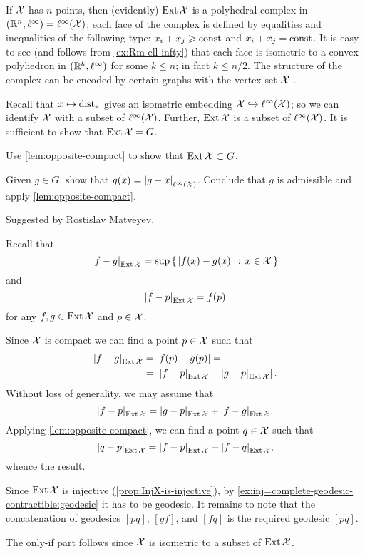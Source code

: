 If $\mathcal{X}$ has $n$-points, then (evidently) $\mathop{\rm Ext}\nolimits\mathcal{X}$ is a polyhedral complex in $(\RR^n,\ell^\infty) \z=\ell^\infty(\spc{X})$;
each face of the complex is defined by equalities and inequalities of the following type: $x_i+x_j\geqslant \operatorname{\rm const}\nolimits$ and  $x_i+x_j= \operatorname{\rm const}\nolimits$.
It is easy to see (and follows from \ref{ex:Rm-ell-infty}) that each face is isometric to a convex polyhedron in  $(\mathbb{R}^k,\ell^\infty)$ for some $k\le n$;
in fact $k\le n/2$.
The structure of the complex can be encoded by certain graphs with the vertex set $\mathcal{X}$ \cite[see Section 4 in][]{lang-2013}.

Recall that $x\mapsto \mathrm{dist}_x$ gives an isometric embedding $\spc{X}\z\hookrightarrow\ell^\infty(\spc{X})$;
so we can identify $\mathcal{X}$ with a subset of $\ell^\infty(\mathcal{X})$.
Further, $\mathop{\rm Ext}\nolimits\mathcal{X}$ is a subset of $\ell^\infty(\mathcal{X})$.
It is sufficient to show that $\mathop{\rm Ext}\nolimits\mathcal{X}=G$.

Use \ref{lem:opposite-compact} to show that $\mathop{\rm Ext}\nolimits\mathcal{X}\subset G$.

Given $g\in G$, show that $g(x)=\dist{g}{x}{\ell^\infty(\spc{X})}$.
Conclude that $g$ is admissible and apply \ref{lem:opposite-compact}.

 Suggested by Rostislav Matveyev.

Recall that 
\[\dist{f}{g}{\Inj\spc{X}}=\sup\set{|f(x)-g(x)|}{x\in\spc{X}}\]
and 
\[\dist{f}{p}{\Inj\spc{X}}=f(p)\]
for any $f,g\in \mathop{\rm Ext}\nolimits\mathcal{X}$ and $p\in \mathcal{X}$.

Since $\mathcal{X}$ is compact we can find a point $p\in\mathcal{X}$ such that 
\begin{align*}
\dist{f}{g}{\Inj\spc{X}}&=|f(p)-g(p)|=
\\
&=\left|\dist{f}{p}{\Inj\spc{X}}-\dist{g}{p}{\Inj\spc{X}}\right|.
\end{align*}
Without loss of generality, we may assume that 
\[\dist{f}{p}{\Inj\spc{X}}
=
\dist{g}{p}{\Inj\spc{X}}
+
\dist{f}{g}{\Inj\spc{X}}.\]
Applying \ref{lem:opposite-compact}, we can find a point $q\in\mathcal{X}$ such that 
\[\dist{q}{p}{\Inj\spc{X}}
=
\dist{f}{p}{\Inj\spc{X}}
+
\dist{f}{q}{\Inj\spc{X}},\]
whence the result.

Since $\mathop{\rm Ext}\nolimits\mathcal{X}$ is injective (\ref{prop:InjX-is-injective}), by \ref{ex:inj=complete-geodesic-contractible:geodesic} it has to be geodesic. It remains to note that the concatenation of geodesics $[pq]$, $[gf]$, and $[fq]$ is the required geodesic $[pq]$.

 The only-if part follows since $\mathcal{X}$ is isometric to a subset of $\mathop{\rm Ext}\nolimits\mathcal{X}$.

